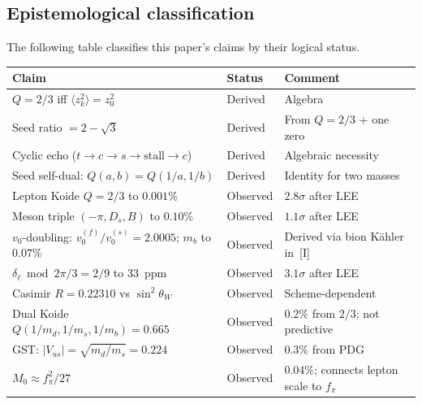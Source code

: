 \documentclass[12pt,a4paper]{article}
\newcommand{\fpi}{f_\pi}
\begin{document}
\subsection{Epistemological classification}

The following table classifies this paper's claims by their logical
status.

\begin{center}
\small
\begin{tabular}{lll}
\toprule
Claim & Status & Comment \\
\midrule
$Q = 2/3$ iff $\langle z_k^2\rangle = z_0^2$ & Derived & Algebra \\
Seed ratio $= 2-\sqrt{3}$ & Derived & From $Q = 2/3$ + one zero \\
Cyclic echo ($t \to c \to s \to \text{stall} \to c$) & Derived & Algebraic necessity \\
Seed self-dual: $Q(a,b) = Q(1/a,1/b)$ & Derived & Identity for two masses \\
\midrule
Lepton Koide $Q = 2/3$ to $0.001\%$ & Observed & $2.8\sigma$ after LEE \\
Meson triple $(-\pi,D_s,B)$ to $0.10\%$ & Observed & $1.1\sigma$ after LEE \\
$v_0$-doubling: $v_0^{(f)}/v_0^{(s)} = 2.0005$; $m_b$ to $0.07\%$ & Observed & Derived via bion K\"ahler in~[I] \\
$\delta_\ell \bmod 2\pi/3 = 2/9$ to 33~ppm & Observed & $3.1\sigma$ after LEE \\
Casimir $R = 0.22310$ vs $\sin^2\theta_W$ & Observed & Scheme-dependent \\
Dual Koide $Q(1/m_d,1/m_s,1/m_b) = 0.665$ & Observed & $0.2\%$ from $2/3$; not predictive \\
GST: $|V_{us}| = \sqrt{m_d/m_s} = 0.224$ & Observed & $0.3\%$ from PDG \\
$M_0 \approx \fpi^2/27$ & Observed & $0.04\%$; connects lepton scale to $\fpi$ \\
\bottomrule
\end{tabular}
\end{center}
\end{document}
